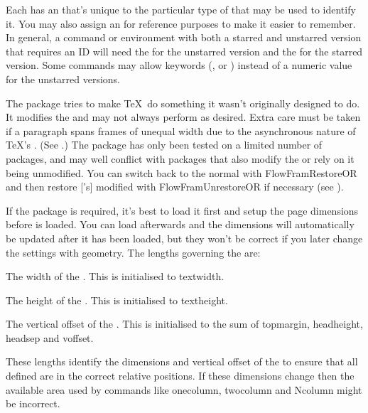 \documentclass[fontsize=12pt]{scrbook}
\begin{document}
Each  has an  that's unique to the particular
type of  that may be used to identify it. You may also
assign an  for reference purposes to make it easier to
remember. In general, a command or environment with both a starred and unstarred
version that requires an ID will need the  for the
unstarred version and the  for the starred version.
Some commands may allow keywords (, 
or ) instead of a numeric value for the unstarred versions.

\begin{important}
The  package tries to make \TeX\ do
something it wasn't originally designed to do. It modifies the
 and may not always perform as desired. Extra care
must be taken if a paragraph spans frames of unequal width due to
the asynchronous nature of \TeX's .  (See
.)
The  package has only been tested on a limited number
of packages, and may well conflict with packages that also modify
the  or rely on it being unmodified.
You can switch back to the normal  with 
\gls{FlowFramRestoreOR} and then restore ['s]
modified  with \gls{FlowFramUnrestoreOR} if necessary (see
).
\end{important}

If the  package is required, it's best to load it
first and setup the page dimensions before  is loaded. You can
load  afterwards and the  dimensions will
automatically be updated after it has been loaded, but they won't be
correct if you later change the settings with \gls{geometry}.
The lengths governing the  are:

The width of the . This is initialised to
\gls{textwidth}.

The height of the . This is initialised to
\gls{textheight}.

The vertical offset of the . This is initialised to
the sum of \gls{topmargin}, \gls{headheight}, \gls{headsep} and \gls{voffset}.

These lengths identify the dimensions and vertical offset of the
 to ensure that all defined  are in the
correct relative positions. If these dimensions change then the
available area used by commands like \gls{onecolumn},
\gls{twocolumn} and \gls{Ncolumn} might be incorrect.
\end{document}
